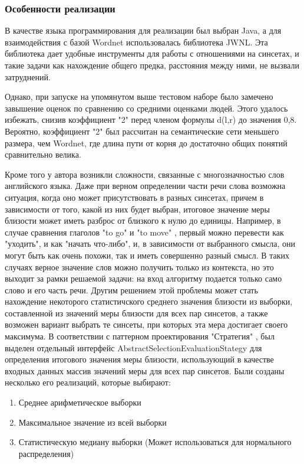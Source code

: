 \subsubsection{Особенности реализации}
В качестве языка программирования для реализации был выбран Java,
а для взаимодействия с базой Wordnet использовалась библиотека JWNL\cite{jwnl}.
Эта библиотека дает удобные инструменты для работы с отношениями на синсетах,
и такие задачи как нахождение общего предка, расстояния между ними, не
вызвали затруднений.

Однако, при запуске на упомянутом выше тестовом наборе было замечено
завышение оценок
по сравнению со средними оценками людей.
Этого удалось избежать, снизив коэффициент "2" перед членом формулы d(l,r)
до значения 0,8. Вероятно, коэффициент "2" был рассчитан на
семантические сети меньшего
размера, чем Wordnet, где длина пути от корня до достаточно общих
понятий сравнительно велика.

Кроме того у  автора возникли сложности, связанные с многозначностью
слов английского языка.
Даже при верном определении части речи слова возможна ситуация, когда
оно может присутствовать
в разных синсетах, причем в зависимости от того, какой из них будет выбран,
итоговое значение меры близости может иметь разброс от близкого к нулю
до единицы.
Например, в случае сравнения глаголов "to go" и "to move" ,  первый
можно перевести как "уходить",
и как "начать что-либо", и, в зависимости от выбранного смысла, они
могут быть как очень похожи,
так и иметь совершенно разный смысл.
В таких случаях верное значение слов можно получить только из
контекста, но это выходит
за рамки решаемой задачи: на вход алгоритму подается только само слово
и его часть речи.
Другим решением этой проблемы может стать нахождение некоторого статистичского
среднего значения близости из выборки, составленной из значений меры
близости для всех пар синсетов,
а также возможен вариант выбрать те синсеты, при которых
эта мера достигает своего максимума.
В соответствии с паттерном проектирования "Стратегия" \cite{strategy}, был выделен
отдельный интерфейс
AbstractSelectionEvaluationStategy для определения итогового значения
меры близости, использующий
в качестве входных данных массив значений меры для всех пар синсетов.
Были созданы несколько его реализаций, которые выбирают:
\begin{enumerate}
\item{Среднее арифметическое выборки}
\item{Максимальное значение из всей выборки}
\item{Статистическую медиану выборки (Может использоваться для
нормального распределения)}
\end{enumerate}

